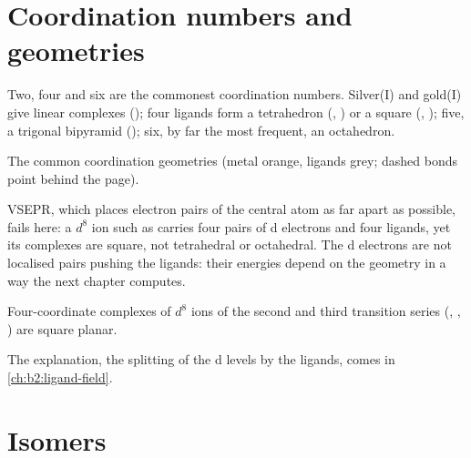 \section{Coordination numbers and geometries}

Two, four and six are the commonest coordination numbers. Silver(I) and gold(I) give
linear complexes (\ce{[Ag(NH3)2]+}); four ligands form a tetrahedron
(, ) or a square (, );
five, a trigonal bipyramid (); six, by far the most frequent, an
octahedron.

\begin{omfigure}

{\small The common coordination geometries (metal orange, ligands grey; dashed
bonds point behind the page).}
\end{omfigure}

VSEPR, which places electron pairs of the central atom as far apart as possible,
fails here: a $d^8$ ion such as  carries four pairs of d electrons and four
ligands, yet its complexes are square, not tetrahedral or octahedral. The
d electrons are not localised pairs pushing the ligands: their energies depend
on the geometry in a way the next chapter computes.

\begin{proposition}\label{prop:b2:coordination-complexes:square-planar}
Four-coordinate complexes of $d^8$ ions of the second and third transition series
(, , ) are square planar.
\end{proposition}

\admitted

The explanation, the splitting of the d levels by the ligands, comes in
\cref{ch:b2:ligand-field}.

\section{Isomers}

